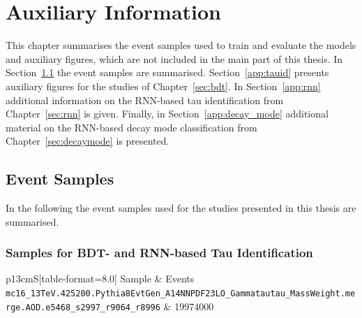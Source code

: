 \chapter{Auxiliary Information}
\label{sec:app}

This chapter summarises the event samples used to train and evaluate the models
and auxiliary figures, which are not included in the main part of this thesis.
In Section~\ref{app:samples} the event samples are summarised.
Section~\ref{app:tauid} presents auxiliary figures for the studies of
Chapter~\ref{sec:bdt}. In Section~\ref{app:rnn} additional information on the
RNN-based tau identification from Chapter~\ref{sec:rnn} is given. Finally, in
Section~\ref{app:decay_mode} additional material on the RNN-based decay mode
classification from Chapter~\ref{sec:decaymode} is presented.

\section{Event Samples}
\label{app:samples}

In the following the event samples used for the studies presented in this thesis
are summarised.

\subsection{Samples for BDT- and RNN-based Tau Identification}
\label{app:preprod_taus}
\label{app:preprod_dijets}

\begin{table}[htbp]
  \centering
  {\small
  \begin{tabular}{p{13cm}S[table-format=8.0]}
    \toprule
    Sample & {Events} \\
    \midrule
    \texttt{mc16\_13TeV.425200.Pythia8EvtGen\_A14NNPDF23LO\_Gammatautau\_MassWeight\newline\hspace*{1em}.merge.AOD.e5468\_s2997\_r9064\_r8996} & 19974000 \\
    \bottomrule
  \end{tabular}
  }
  \caption[Signal samples used for BDT- and RNN-based Tau Identification]{Signal
    samples ($\gamma^* \to \tauhad\tauhad$) used for BDT- and RNN-based Tau
    Identification}
  \label{tab:samples_preprod_taus}
\end{table}

